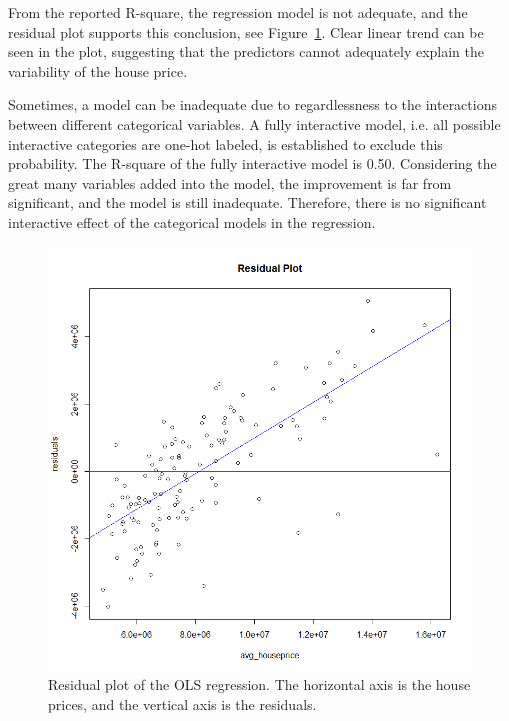 \documentclass{article}
\begin{document}
From the reported R-square, the regression model is not adequate, and the residual plot supports this conclusion, see Figure~\ref{fig4}. Clear linear trend can be seen in the plot, suggesting that the predictors cannot adequately explain the variability of the house price.

Sometimes, a model can be inadequate due to regardlessness to the interactions between different categorical variables. A fully interactive model, i.e. all possible interactive categories are one-hot labeled, is established to exclude this probability. The R-square of the fully interactive model is 0.50. Considering the great many variables added into the model, the improvement is far from significant, and the model is still inadequate. Therefore, there is no significant interactive effect of the categorical models in the regression.

\begin{figure}[ht]
\vskip 0.2in
\begin{center}
\centerline{\includegraphics[width=\columnwidth]{residual_y_plot}}
\caption{Residual plot of the OLS regression. The horizontal axis is the house prices, and the vertical axis is the residuals.}
\label{fig4}
\end{center}
\vskip -0.2in
\end{figure}
\end{document}
